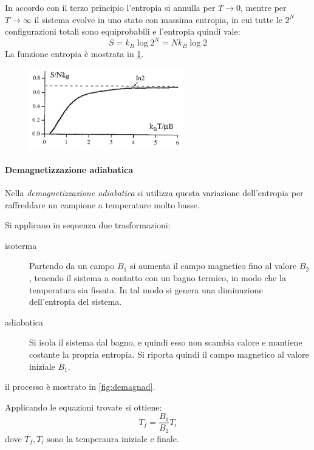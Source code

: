 In accordo con il terzo principio l'entropia si annulla per $ T \rightarrow 0 $, mentre per $ T \rightarrow \infty $ il sistema evolve in uno stato con massima entropia, in cui tutte le $ 2^N $ configurazioni totali sono equiprobabili e l'entropia quindi vale:
\begin{equation*}
S = k_B \log 2^N = N k_B \log 2
\end{equation*}
La funzione entropia è mostrata in \cref{fig:isingentropy}.

\begin{figure}[t]
	\centering
	\includegraphics[width=0.6\textwidth]{Immagini/IsingEntropy.png}
	\vspace{-10pt}
	\caption{}
	\label{fig:isingentropy}
	\vspace{-10pt}
\end{figure}

\paragraph{Demagnetizzazione adiabatica} Nella \textit{demagnetizzazione adiabatica} si utilizza questa variazione dell'entropia per raffreddare un campione a temperature molto basse.

Si applicano in sequenza due trasformazioni:
\begin{description}
	\item[isoterma] Partendo da un campo $ B_1 $ si aumenta il campo magnetico fino al valore $ B_2 $, tenendo il sistema a contatto con un bagno termico, in modo che la temperatura sia fissata. In tal modo si genera una diminuzione dell'entropia del sistema.
	\item[adiabatica] Si isola il sistema dal bagno, e quindi esso non scambia calore e mantiene costante la propria entropia. Si riporta quindi il campo magnetico al valore iniziale $ B_1 $.
\end{description}
il processo è mostrato in \cref{fig:demagnad}.
\newline

Applicando le equazioni trovate si ottiene:
\begin{equation*}
T_f = \frac{B_1}{B_2} T_i
\end{equation*}
dove $ T_f, T_i $ sono la temperaura iniziale e finale.


